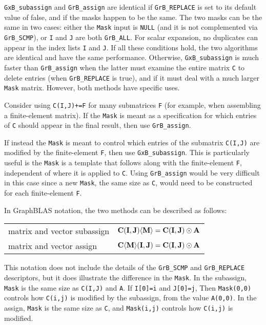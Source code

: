 \documentclass[12pt]{article}
\begin{document}
\verb'GxB_subassign' and \verb'GrB_assign' are identical if \verb'GrB_REPLACE'
is set to its default value of false, and if the masks happen to be the same.
The two masks can be the same in two cases:  either the \verb'Mask' input is
\verb'NULL' (and it is not complemented via \verb'GrB_SCMP'), or \verb'I' and
\verb'J' are both \verb'GrB_ALL'.  For scalar expansion, no duplicates can
appear in the index lists \verb'I' and \verb'J'.  If all these conditions hold,
the two algorithms are identical and have the same performance.  Otherwise,
\verb'GxB_subassign' is much faster than \verb'GrB_assign' when the latter
must examine the entire matrix \verb'C' to delete entries (when
\verb'GrB_REPLACE' is true), and if it must deal with a much larger \verb'Mask'
matrix.  However, both methods have specific uses.

Consider using \verb'C(I,J)+=F' for many submatrices \verb'F' (for example,
when assembling a finite-element matrix).  If the \verb'Mask' is meant as a
specification for which entries of \verb'C' should appear in the final result,
then use \verb'GrB_assign'.

If instead the \verb'Mask' is meant to control which entries of the submatrix
\verb'C(I,J)' are modified by the finite-element \verb'F', then use
\verb'GxB_subassign'.  This is particularly useful is the \verb'Mask' is a
template that follows along with the finite-element \verb'F', independent of
where it is applied to \verb'C'.  Using \verb'GrB_assign' would be very
difficult in this case since a new \verb'Mask', the same size as \verb'C',
would need to be constructed for each finite-element \verb'F'.

In GraphBLAS notation, the two methods can be described as follows:

\vspace{0.05in}
\begin{tabular}{ll}
\hline
matrix and vector subassign & ${\bf C(I,J) \langle M \rangle}  = {\bf C(I,J)} \odot {\bf A}$ \\
matrix and vector    assign & ${\bf C \langle M \rangle (I,J)} = {\bf C(I,J)} \odot {\bf A}$ \\
\hline
\end{tabular}
\vspace{0.05in}

This notation does not include the details of the \verb'GrB_SCMP' and
\verb'GrB_REPLACE' descriptors, but it does illustrate the difference in the
\verb'Mask'.  In the subassign, \verb'Mask' is the same size as \verb'C(I,J)'
and \verb'A'.  If \verb'I[0]=i' and \verb'J[0]=j', Then \verb'Mask(0,0)'
controls how \verb'C(i,j)' is modified by the subassign, from the value
\verb'A(0,0)'.  In the assign, \verb'Mask' is the same size as \verb'C', and
\verb'Mask(i,j)' controls how \verb'C(i,j)' is modified.
\end{document}

